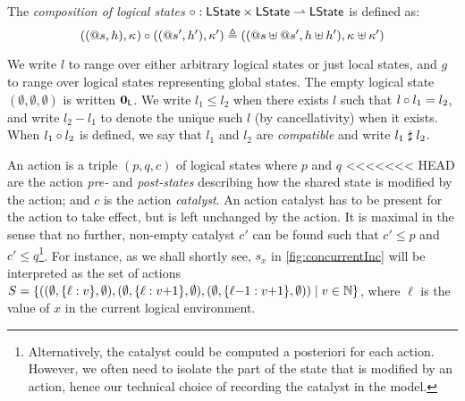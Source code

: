 \begin{definition}
  The \emph{composition of logical states} $ \circ : \mathsf{LState}
  \times \mathsf{LState} \rightharpoonup \mathsf{LState} $ is defined
  as:
  \[
  ((@s, h),\kappa_{}) \circ ((@s', h'), \kappa_{}') \triangleq
  ((@s\uplus @s', h\uplus h'), \kappa_{}\uplus \kappa_{}')
  \]
\end{definition}

We write $l$ to range over either arbitrary logical states or just
local states, and $g$ to range over logical states representing global
states. The empty logical state $(\emptyset, \emptyset, \emptyset)$ is
written $\mathbf{0}_{\mathsf{L}}$. We write $l_1 \leq l_2$ when there exists $l$ such
that $l\circ l_1 = l_2$, and write $l_2 - l_1$ to denote the
unique such $l$ (by cancellativity) when it exists. When $l_1\circ
l_2$ is defined, we say that $l_1$ and $l_2$ are \emph{compatible} and
write $l_1\mathrel{\sharp} l_2$.

An action is a triple $(p, q, c)$ of logical states where $p$ and $q$
<<<<<<< HEAD
are the action \emph{pre-} and \emph{post-states} describing how the
shared state is modified by the action; and $c$ is the action
\emph{catalyst}. An action catalyst has to be present for the action
to take effect, but is left unchanged by the action. It is maximal in
the sense that no further, non-empty catalyst $c'$ can be found such
that $c' \leq p$ and $c' \leq q$\footnote{Alternatively, the catalyst
could be computed a posteriori for each action.  However, we often
need to isolate the part of the state that is modified by an action,
hence our technical choice of recording the catalyst in the model.}. 
For instance, \label{ex:sxsem} as we shall shortly
see, $s_x$ in \fig\ref{fig:concurrentInc} will be interpreted as the
set of actions $S=\{((\emptyset, \{\ell:v\}, \emptyset),
(\emptyset, \{\ell:v{+}1\}, \emptyset), (\emptyset, \{\ell{-}1:v{+}1\},
\emptyset))\mid v \in \mathbb{N}\}$, where $\ell$ is the value of $x$ in the
current logical environment. 

